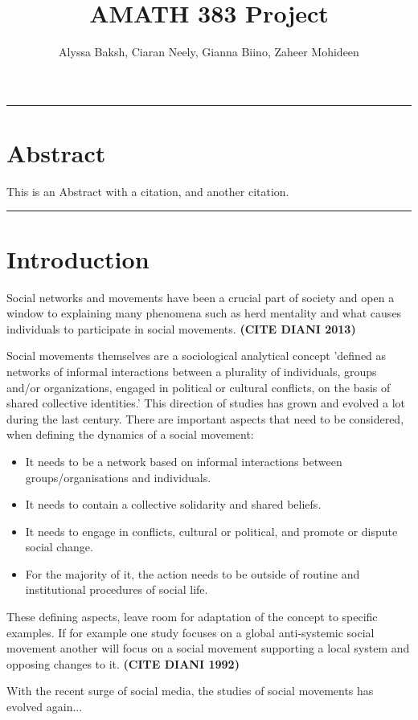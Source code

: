 \documentclass{article}
\title{AMATH 383 Project}
\author{
    Alyssa Baksh, 
    Ciaran Neely,
    Gianna Biino,
    Zaheer Mohideen
}
\begin{document}
    \maketitle
    
    \hrule
    \section{Abstract}
    This is an Abstract with a citation\cite{kaveh_defining_2020}, and another citation\cite{small_movements_2021}.
    \hrule
    \section{Introduction}
    Social networks and movements have been a crucial part of society and open a window to explaining many phenomena such as herd mentality and what causes individuals to participate in social movements. \textbf{(CITE DIANI 2013)}
    
    Social movements themselves are a sociological analytical concept 'defined as networks of informal interactions between a plurality of individuals, groups and/or organizations, engaged in political or cultural conflicts, on the basis of shared collective identities.' This direction of studies has grown and evolved a lot during the last century. There are important aspects that need to be considered, when defining the dynamics of a social movement: 
    \begin{itemize}
    \item It needs to be a network based on informal interactions between groups/organisations and individuals. 
    \item It needs to contain a collective solidarity and shared beliefs.
    \item It needs to engage in conflicts, cultural or political, and promote or dispute social change.
    \item  For the majority of it, the action needs to be outside of routine and institutional procedures of social life.
    \end{itemize}
    These defining aspects, leave room for adaptation of the concept to specific examples. If for example one study focuses on a global anti-systemic social movement another will focus on a social movement supporting a local system and opposing changes to it. \textbf{(CITE DIANI 1992)}
    
    With the recent surge of social media, the studies of social movements has evolved again...
    
\end{document}
